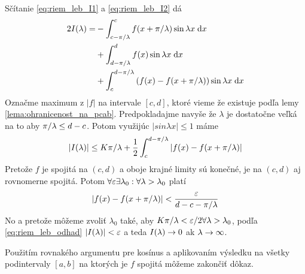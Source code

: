 \begin{dokaz}
    Sčítanie \ref{eq:riem_leb_I1} a \ref{eq:riem_leb_I2} dá
    \begin{equation}
    \begin{split}
        2I(\lambda) =&-\int_{c-\pi/\lambda}^c f(x+\pi/\lambda) \sin \lambda x \; \mathrm{d} x 
                \\ &+
                \int_{d-\pi/\lambda}^d f(x) \sin \lambda x \; \mathrm{d} x \\
                &+
                \int_c^{d-\pi/\lambda} \left( 
                    f(x) - f(x+\pi/\lambda)
                    \right) \sin \lambda x \; \mathrm{d} x
    \end{split}
    \end{equation}
    Označme maximum z $|f|$ na intervale $[c,d]$, ktoré vieme že
    existuje podľa lemy \ref{lema:ohranicenost_na_pcab}.
    Predpokladajme navyše že $\lambda$ je dostatočne veľká na to aby
    $\pi/\lambda \le d-c$. Potom využijúc $|sin \lambda x|\le1$ máme
    \begin{equation}
        |I(\lambda)| \le K \pi/\lambda + \frac{1}{2} \int_c^{d-\pi/\lambda}
            \left|f(x) - f(x+\pi/\lambda)\right|
        \label{eq:riem_leb_odhad}
    \end{equation}
    Pretože $f$ je spojitá na $(c,d)$ a oboje krajné limity sú konečné,
    je na $(c,d)$ aj rovnomerne spojitá. 
    Potom $\forall \varepsilon \exists \lambda_0: \forall \lambda>\lambda_0$
    platí
    \begin{equation}
        |f(x) - f(x+\pi/\lambda)| < \frac{\varepsilon}{d-c-\pi/\lambda}
    \end{equation}
    No a pretože môžeme zvoliť $\lambda_0$ také, aby $K \pi/\lambda < \varepsilon/2
    \forall \lambda>\lambda_0$, podľa \ref{eq:riem_leb_odhad}
    $|I(\lambda)|<\varepsilon$ a teda $I(\lambda)\rightarrow0$ ak
    $\lambda\rightarrow\infty$.
    
    Použitím rovnakého argumentu pre kosínus a aplikovaním výsledku 
    na všetky podintervaly $[a,b]$ na ktorých je $f$ spojitá môžeme
    zakončiť dôkaz.
\end{dokaz}

